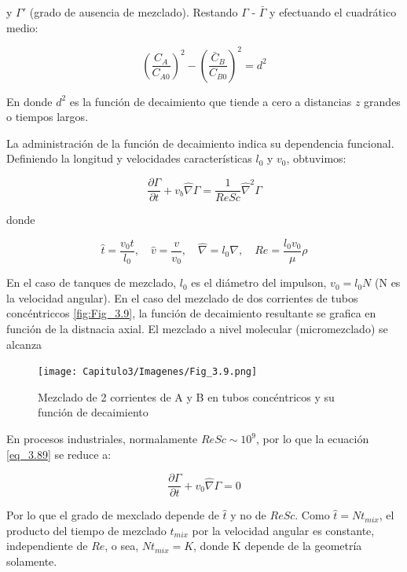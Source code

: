 y $\Gamma'$ (grado de ausencia de mezclado). Restando $\Gamma$ - $\bar{\Gamma}$  y efectuando el cuadrático medio:

\begin{equation}
    \left( \frac{C_A}{C_{A0}} \right)^2 - \left( \frac{\bar{C}_B}{C_{B0}} \right)^2 = d^2
\end{equation}

En donde $d^2$ es la función de decaimiento que tiende a cero a distancias $z$ grandes o tiempos largos.


La administración de la función de decaimiento indica su dependencia funcional. Definiendo la longitud y velocidades características $l_{0}$ y $v_{0}$, obtuvimos:

\begin{equation}
    \frac{\partial\Gamma}{\partial t} + v_{b}\hat{\nabla}\Gamma = \frac{1}{Re Sc}\hat{\nabla}^{2}\Gamma  \label{eq_3.89}
\end{equation}


donde 

\begin{equation}
      \hat{t}=\frac{v_0t}{l_0}, \quad 
      \hat{v}=\frac{v}{v_0},\quad
      \hat{\nabla}=l_0\nabla, \quad
       Re=\frac{l_0v_0}{\mu}\rho 
\end{equation}

En el caso de tanques de mezclado, $l_0$ es el diámetro del impulson, $v_0=l_0N$ (N es la velocidad angular). En el caso del mezclado de dos corrientes de tubos concéntriccos \eqref{fig:Fig_3.9}, la función de decaimiento resultante se grafica en función de la distnacia axial. El mezclado a nivel molecular (micromezclado) se alcanza

\begin{figure}[h]

        \texttt{[image: Capitulo3/Imagenes/Fig\_3.9.png]}
        \caption{Mezclado de 2 corrientes de A y B en tubos concéntricos y su función de decaimiento}
        \label{fig:Fig_3.9}

\end{figure}

En procesos industriales, normalamente $ReSc\sim10^9$, por lo que la ecuación \eqref{eq_3.89} se reduce a:


\begin{equation}
    \frac{\partial\Gamma}{\partial t} + v_0\hat{\nabla}\Gamma = 0
\end{equation}


Por lo que el grado de mexclado depende de $\hat{t}$ y no de $ReSc$. Como $\hat{t}=Nt_{mix}$, el producto del tiempo de mezclado $t_{mix}$ por la velocidad angular es constante, independiente de $Re$, o sea, $Nt_{mix}=K$, donde K depende de la geometría solamente.

